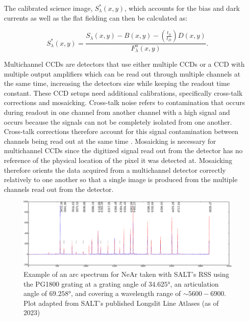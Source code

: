 The calibrated science image, $S^{*}_{\lambda}(x,y)$, which accounts for the bias and dark currents as well as the flat fielding can then be calculated as:

\begin{equation}
    S^{*}_{\lambda}(x,y) = \frac{S_{\lambda}(x,y) - B(x,y) - (\frac{t_{S}}{t_{D}})D(x,y)}{F^{n}_{\lambda}(x,y)}.
    \label{eq:science_cal}
\end{equation}

Multichannel \glspl{CCD} are detectors that use either multiple \glspl{CCD} or a \gls{CCD} with multiple output amplifiers which can be read out through multiple channels at the same time, increasing the detectors size while keeping the readout time constant. These \gls{CCD} setups need additional calibrations, specifically cross-talk corrections and mosaicking. Cross-talk noise refers to contamination that occurs during readout in one channel from another channel with a high signal and occurs because the signals can not be completely isolated from one another. Cross-talk corrections therefore account for this signal contamination between channels being read out at the same time \citep{CrossTalk}. Mosaicking is necessary for multichannel \glspl{CCD} since the digitized signal read out from the detector has no reference of the physical location of the pixel it was detected at. Mosaicking therefore orients the data acquired from a multichannel detector correctly relatively to one another so that a single image is produced from the multiple channels read out from the detector.

\begin{figure}[t]
    \centering
    \includegraphics[width = 16cm]{figures/2_Ne_arc.pdf}
    \caption{Example of an arc spectrum for NeAr taken with \gls{SALT}'s \gls{RSS} using the PG1800 grating at a grating angle of $34.625$°, an articulation angle of $69.258$°, and covering a wavelength range of $\sim5600 - 6900$\angstrom. Plot adapted from \gls{SALT}'s published Longslit Line Atlases (as of 2023)\protect\footnotemark}
    \label{fig:Ne_arc}
\end{figure}


